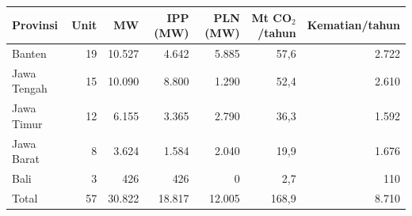 \begin{tabular}{lrrrrrr}
\toprule
Provinsi & Unit & MW & IPP (MW) & PLN (MW) & Mt CO$_2$/tahun & Kematian/tahun \\
\midrule
Banten & 19 & 10.527 & 4.642 & 5.885 & 57,6 & 2.722 \\
Jawa Tengah & 15 & 10.090 & 8.800 & 1.290 & 52,4 & 2.610 \\
Jawa Timur & 12 & 6.155 & 3.365 & 2.790 & 36,3 & 1.592 \\
Jawa Barat & 8 & 3.624 & 1.584 & 2.040 & 19,9 & 1.676 \\
Bali & 3 & 426 & 426 & 0 & 2,7 & 110 \\
\midrule
Total & 57 & 30.822 & 18.817 & 12.005 & 168,9 & 8.710 \\
\bottomrule
\end{tabular}
